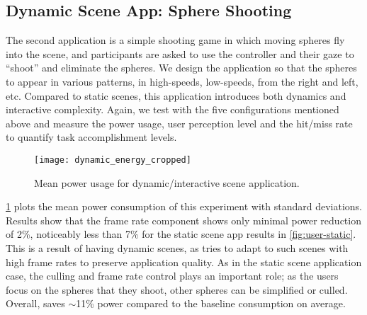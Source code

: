


\subsection{Dynamic Scene App: Sphere Shooting}

The second application is a simple shooting game in which moving spheres fly into the 
scene, and participants are asked to use the controller and
their gaze to ``shoot'' and eliminate the spheres.
%
We design the application so that the spheres to appear in various patterns, in 
high-speeds, low-speeds, from the right and left, etc. %
%
Compared to static scenes, this application introduces both dynamics 
and interactive complexity.
%
Again, we test with the five configurations mentioned above and measure the power usage, 
user perception level and the hit/miss rate to quantify task accomplishment levels. 



\begin{figure}[t]
    \centering
    \vspace{-2ex}
    \texttt{[image: dynamic\_energy\_cropped]}
    \vspace{-3ex}
    \caption{Mean power usage for dynamic/interactive scene application.}
    \label{fig:user-dynamic-energy}
\end{figure}


\fig\ref{fig:user-dynamic-energy} plots the mean power consumption of this 
experiment with standard deviations.
%
Results show that the frame rate component shows only minimal power reduction of 2\%, 
noticeably less than 7\% for the static scene app results in \fig\ref{fig:user-static}. 
%
This is a result of having dynamic scenes, as {\myit} tries to adapt to such 
scenes with high frame rates to preserve application quality.
%
As in the static scene application case, the culling and frame rate control 
plays an important role; as the users focus on the spheres that
they shoot, other spheres can be simplified or culled. Overall, {\myit} 
saves $\sim$11\% power compared to the baseline consumption on average. 


